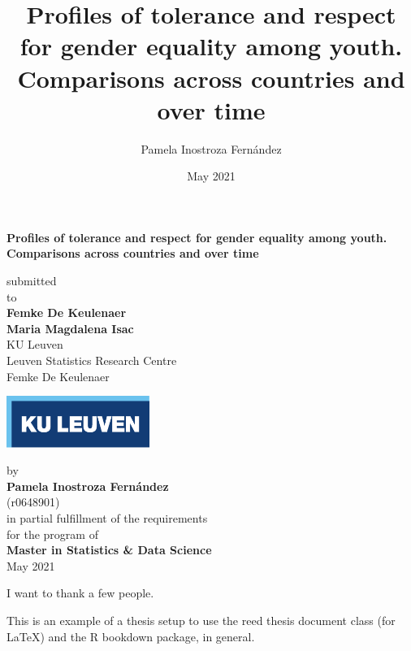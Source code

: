 \documentclass[12pt,twoside]{reedthesis}
\title{Profiles of tolerance and respect for gender equality among youth. Comparisons across countries and over time}
\author{Pamela Inostroza Fernández}
\date{May 2021}
\institute{Leuven Statistics Research Centre}
\begin{document}
\thispagestyle{empty}
\begin{center}
  {\Large{\bf Profiles of tolerance and respect for gender equality among youth. Comparisons across countries and over time}} \vspace{0.5cm}

   submitted \\\vspace{0.5cm}
  to \\\vspace{0.5cm}
  \textbf{Femke De Keulenaer} \\
  \textbf{Maria Magdalena Isac} \\\vspace{0.5cm}
  KU Leuven \\
  Leuven Statistics Research Centre \\
  Femke De Keulenaer \\
   \vspace{1cm}

  \includegraphics[width=0.35\textwidth]{KUL.pdf}
  
  by \\\vspace{0.5cm}
  \textbf{Pamela Inostroza Fernández} \\
  (r0648901) \\
  
  \medskip
  \medskip
  in partial fulfillment of the requirements \\
  for the program of \\
  \textbf{Master in Statistics \& Data Science} \\\vspace{0.5cm}
  May 2021
  
\end{center}
 \maketitle

\frontmatter %
\pagestyle{empty} %
  \begin{acknowledgements}
    I want to thank a few people.
  \end{acknowledgements}
  \begin{preface}
    This is an example of a thesis setup to use the reed thesis document class
    (for LaTeX) and the R bookdown package, in general.
  \end{preface}
  \hypersetup{linkcolor=black}
  \setcounter{secnumdepth}{2}
  \setcounter{tocdepth}{2}
  \tableofcontents
\end{document}
